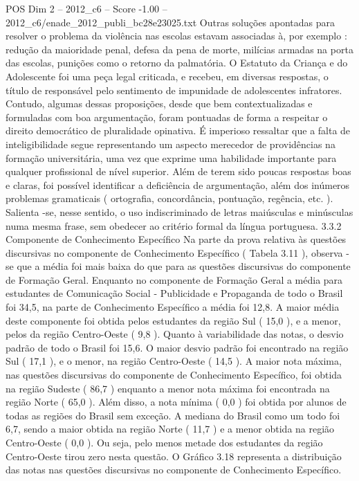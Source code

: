\begin{textsample}{POS Dim 2 – 2012\_c6 – Score -1.00 – 2012\_c6/enade\_2012\_publi\_bc28e23025.txt}
Outras soluções apontadas para resolver o problema da violência nas escolas estavam associadas à, por exemplo : redução da maioridade penal, defesa da pena de morte, milícias armadas na porta das escolas, punições como o retorno da palmatória.
O Estatuto da Criança e do Adolescente foi uma peça legal criticada, e recebeu, em diversas respostas, o título de responsável pelo sentimento de impunidade de adolescentes infratores.
Contudo, algumas dessas proposições, desde que bem contextualizadas e formuladas com boa argumentação, foram pontuadas de forma a respeitar o direito democrático de pluralidade opinativa.
É imperioso ressaltar que a falta de inteligibilidade segue representando um aspecto merecedor de providências na formação universitária, uma vez que exprime uma habilidade importante para qualquer profissional de nível superior.
Além de terem sido poucas respostas boas e claras, foi possível identificar a deficiência de argumentação, além dos inúmeros problemas gramaticais ( ortografia, concordância, pontuação, regência, etc. ).
Salienta -se, nesse sentido, o uso indiscriminado de letras maiúsculas e minúsculas numa mesma frase, sem obedecer ao critério formal da língua portuguesa. 3.3.2 Componente de Conhecimento Específico Na parte da prova relativa às questões discursivas no componente de Conhecimento Específico ( Tabela 3.11 ), observa -se que a média foi mais baixa do que para as questões discursivas do componente de Formação Geral.
Enquanto no componente de Formação Geral a média para estudantes de Comunicação Social - Publicidade e Propaganda de todo o Brasil foi 34,5, na parte de Conhecimento Específico a média foi 12,8.
A maior média deste componente foi obtida pelos estudantes da região Sul ( 15,0 ), e a menor, pelos da região Centro-Oeste ( 9,8 ).
Quanto à variabilidade das notas, o desvio padrão de todo o Brasil foi 15,6.
O maior desvio padrão foi encontrado na região Sul ( 17,1 ), e o menor, na região Centro-Oeste ( 14,5 ).
A maior nota máxima, nas questões discursivas do componente de Conhecimento Específico, foi obtida na região Sudeste ( 86,7 ) enquanto a menor nota máxima foi encontrada na região Norte ( 65,0 ).
Além disso, a nota mínima ( 0,0 ) foi obtida por alunos de todas as regiões do Brasil sem exceção.
A mediana do Brasil como um todo foi 6,7, sendo a maior obtida na região Norte ( 11,7 ) e a menor obtida na região Centro-Oeste ( 0,0 ).
Ou seja, pelo menos metade dos estudantes da região Centro-Oeste tirou zero nesta questão.
O Gráfico 3.18 representa a distribuição das notas nas questões discursivas no componente de Conhecimento Específico.

\end{textsample}

